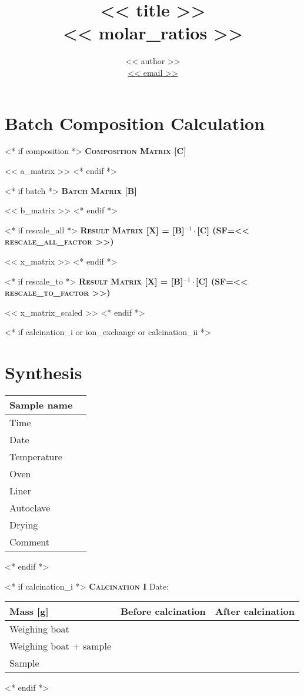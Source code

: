 \documentclass[10pt,a4paper]{article}
\title{<< title >> \\ {\large \normalfont << molar_ratios >>}}
\author{ << author >> \\
\href{mailto: << email >>}{{\color{bl}<< email >>}}\\}
\makeatletter
\newcommand{\subsecwithdate}[1]{{\color{bl}\scshape\bfseries\large {#1} }\hfill %
{\color{bl} Date: \Ovalbox{ \begin{minipage}{1.2in} \hfill\vspace{10pt} \end{minipage} }} \par}
\newcommand{\subsecwodate}[1]{{\color{bl}\scshape\bfseries\large {#1} } \par }
\def\printtitle{%
    {\color{bl} \centering \huge \sc \textbf{\@title}\par}}		%
\def\printauthor{%
    {\centering \small \@author}}				%
\makeatother
\begin{document}
\printtitle

\printauthor

\section{Batch Composition Calculation}
<* if composition *>
\subsecwodate{Composition Matrix [C]}
<< a_matrix >>
<* endif *>

<* if batch *>
\subsecwodate{Batch Matrix [B]}
<< b_matrix >>
<* endif *>

<* if rescale_all *>
\subsecwodate{Result Matrix [X] = [B]$^{-1}\cdot$[C] (SF=<< rescale_all_factor >>)}
<< x_matrix >>
<* endif *>

<* if rescale_to *>
\subsecwodate{Result Matrix [X] = [B]$^{-1}\cdot$[C] (SF=<< rescale_to_factor >>)}
<< x_matrix_scaled >>
<* endif *>


<* if calcination_i or ion_exchange or calcination_ii *>
\newpage
\section{Synthesis}
\begin{center}
\begin{tabularx}{\textwidth}{l|C}
\toprule
Sample name & \\
\midrule
Time & \\ 
Date & \\ 
Temperature & \\ 
Oven & \\ 
Liner & \\ 
Autoclave & \\ 
Drying & \\ 
Comment & \\
\bottomrule
\end{tabularx}
\end{center}
<* endif *>

<* if calcination_i *>
\subsecwithdate{Calcination I}
\begin{center}
\begin{tabularx}{\textwidth}{l|C|C}
\toprule
Mass [g] & Before calcination & After calcination \\
\midrule
Weighing boat & & \\ 
Weighing boat + sample & & \\ 
Sample & & \\
\bottomrule
\end{tabularx}
\end{center}
<* endif *>
\end{document}
